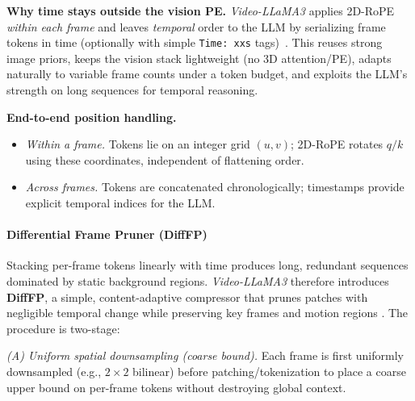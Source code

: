 \begin{enrichment}
\begin{enrichment}
        \textbf{Why time stays outside the vision PE.} \;
        \emph{Video\mbox{-}LLaMA3} applies 2D\mbox{-}RoPE \emph{within each frame} and leaves \emph{temporal} order to the LLM by serializing frame tokens in time (optionally with simple \texttt{Time: xxs} tags)~\cite[Sec.~3.1--3.2]{zhang2025_videollama3}. This reuses strong image priors, keeps the vision stack lightweight (no 3D attention/PE), adapts naturally to variable frame counts under a token budget, and exploits the LLM’s strength on long sequences for temporal reasoning.
        
        \textbf{End\mbox{-}to\mbox{-}end position handling.} \;
        \begin{itemize}
            \item \emph{Within a frame.} Tokens lie on an integer grid $(u,v)$; 2D\mbox{-}RoPE rotates $q/k$ using these coordinates, independent of flattening order.
            \item \emph{Across frames.} Tokens are concatenated chronologically; timestamps provide explicit temporal indices for the LLM.
        \end{itemize}
        
        \paragraph{Differential Frame Pruner (DiffFP)}
        Stacking per\mbox{-}frame tokens linearly with time produces long, redundant sequences dominated by static background regions. \emph{Video\mbox{-}LLaMA3} therefore introduces \textbf{DiffFP}, a simple, content\mbox{-}adaptive compressor that prunes patches with negligible temporal change while preserving key frames and motion regions \cite[Sec.~3.2]{zhang2025_videollama3}. The procedure is two\mbox{-}stage:
        
        \textit{(A) Uniform spatial downsampling (coarse bound).} Each frame is first uniformly downsampled (e.g., $2{\times}2$ bilinear) before patching/tokenization to place a coarse upper bound on per\mbox{-}frame tokens without destroying global context.
        

\end{enrichment}
\end{enrichment}
